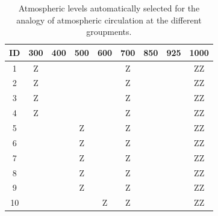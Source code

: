 \documentclass[twocol]{ametsoc}
\begin{document}
\begin{table}[htbp]
	\footnotesize
	\caption{Atmospheric levels automatically selected for the analogy of atmospheric circulation at the different groupments.}
	\begin{center}
		\begin{tabular}{ccccccccc}
			\hline \textbf{ID} & \textbf{300} & \textbf{400} & \textbf{500} & \textbf{600} & \textbf{700} & \textbf{850} & \textbf{925} & \textbf{1000} \\ 
			\hline 
			1  & Z &   &   &   & Z &   &   & ZZ \\
			2  & Z &   &   &   & Z &   &   & ZZ \\
			3  & Z &   &   &   & Z &   &   & ZZ \\
			4  & Z &   &   &   & Z &   &   & ZZ \\
			5  &   &   & Z &   & Z &   &   & ZZ \\
			6  &   &   & Z &   & Z &   &   & ZZ \\
			7  &   &   & Z &   & Z &   &   & ZZ \\
			8  &   &   & Z &   & Z &   &   & ZZ \\
			9  &   &   & Z &   & Z &   &   & ZZ \\
			10 &   &   &   & Z & Z &   &   & ZZ \\
			\hline 
		\end{tabular} 
	\end{center}
	\label{table:levels_GA_z4}
\end{table}
\end{document}

